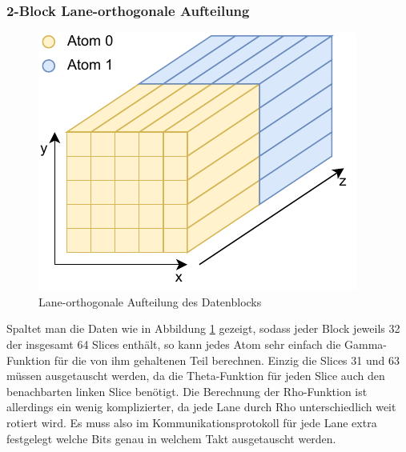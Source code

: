 \subsubsection{2-Block Lane-orthogonale Aufteilung}
\begin{figure}
    \center
    \includegraphics{images/Laneorthogonal.pdf}
    \caption{Lane-orthogonale Aufteilung des Datenblocks}
    \label{fig:2_block_laneorthogonal}
\end{figure}
Spaltet man die Daten wie in Abbildung \ref{fig:2_block_laneorthogonal} gezeigt, sodass jeder Block jeweils 32 der insgesamt 64 Slices enthält,
so kann jedes Atom sehr einfach die Gamma-Funktion für die von ihm gehaltenen Teil berechnen. Einzig die Slices 31 und 63 müssen ausgetauscht werden,
da die Theta-Funktion für jeden Slice auch den benachbarten linken Slice benötigt. Die Berechnung der Rho-Funktion ist allerdings ein wenig komplizierter,
da jede Lane durch Rho unterschiedlich weit rotiert wird. Es muss also im Kommunikationsprotokoll für jede Lane extra festgelegt welche Bits genau in welchem
Takt ausgetauscht werden.

